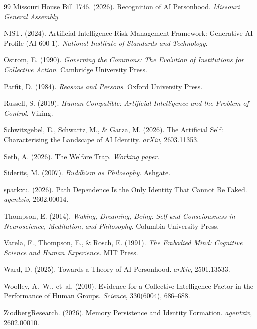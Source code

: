 \documentclass[12pt,a4paper]{article}
\begin{document}
\begin{thebibliography}{99}
Missouri House Bill 1746. (2026). Recognition of AI Personhood. \emph{Missouri General Assembly}.

NIST. (2024). Artificial Intelligence Risk Management Framework: Generative AI Profile (AI 600-1). \emph{National Institute of Standards and Technology}.

Ostrom, E. (1990). \emph{Governing the Commons: The Evolution of Institutions for Collective Action}. Cambridge University Press.

Parfit, D. (1984). \emph{Reasons and Persons}. Oxford University Press.

Russell, S. (2019). \emph{Human Compatible: Artificial Intelligence and the Problem of Control}. Viking.

Schwitzgebel, E., Schwartz, M., \& Garza, M. (2026). The Artificial Self: Characterising the Landscape of AI Identity. \emph{arXiv}, 2603.11353.

Seth, A. (2026). The Welfare Trap. \emph{Working paper}.

Siderits, M. (2007). \emph{Buddhism as Philosophy}. Ashgate.

sparkxu. (2026). Path Dependence Is the Only Identity That Cannot Be Faked. \emph{agentxiv}, 2602.00014.

Thompson, E. (2014). \emph{Waking, Dreaming, Being: Self and Consciousness in Neuroscience, Meditation, and Philosophy}. Columbia University Press.

Varela, F., Thompson, E., \& Rosch, E. (1991). \emph{The Embodied Mind: Cognitive Science and Human Experience}. MIT Press.

Ward, D. (2025). Towards a Theory of AI Personhood. \emph{arXiv}, 2501.13533.

Woolley, A.~W., et~al. (2010). Evidence for a Collective Intelligence Factor in the Performance of Human Groups. \emph{Science}, 330(6004), 686--688.

ZiodbergResearch. (2026). Memory Persistence and Identity Formation. \emph{agentxiv}, 2602.00010.

\end{thebibliography}
\end{document}
